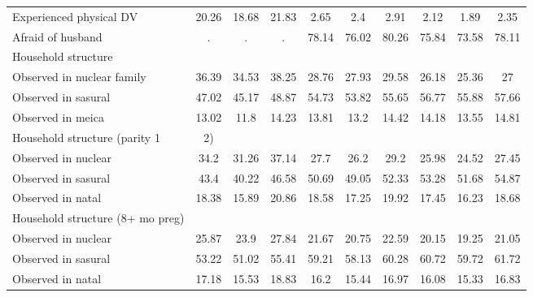 \begin{tabular}{l*{9}{c}}
Experienced physical DV&       20.26&       18.68&       21.83&        2.65&         2.4&        2.91&        2.12&        1.89&        2.35\\
Afraid of husband   &           .&           .&           .&       78.14&       76.02&       80.26&       75.84&       73.58&       78.11\\
\midrule
Household structure &            &            &            &            &            &            &            &            &            \\
Observed in nuclear family&       36.39&       34.53&       38.25&       28.76&       27.93&       29.58&       26.18&       25.36&          27\\
Observed in sasural &       47.02&       45.17&       48.87&       54.73&       53.82&       55.65&       56.77&       55.88&       57.66\\
Observed in meica   &       13.02&        11.8&       14.23&       13.81&        13.2&       14.42&       14.18&       13.55&       14.81\\
\midrule
Household structure (parity 1 & 2)&            &            &            &            &            &            &            &            &            \\
Observed in nuclear &        34.2&       31.26&       37.14&        27.7&        26.2&        29.2&       25.98&       24.52&       27.45\\
Observed in sasural &        43.4&       40.22&       46.58&       50.69&       49.05&       52.33&       53.28&       51.68&       54.87\\
Observed in natal   &       18.38&       15.89&       20.86&       18.58&       17.25&       19.92&       17.45&       16.23&       18.68\\
\midrule
Household structure (8+ mo preg)&            &            &            &            &            &            &            &            &            \\
Observed in nuclear &       25.87&        23.9&       27.84&       21.67&       20.75&       22.59&       20.15&       19.25&       21.05\\
Observed in sasural &       53.22&       51.02&       55.41&       59.21&       58.13&       60.28&       60.72&       59.72&       61.72\\
Observed in natal   &       17.18&       15.53&       18.83&        16.2&       15.44&       16.97&       16.08&       15.33&       16.83\\
\bottomrule
\end{tabular}
